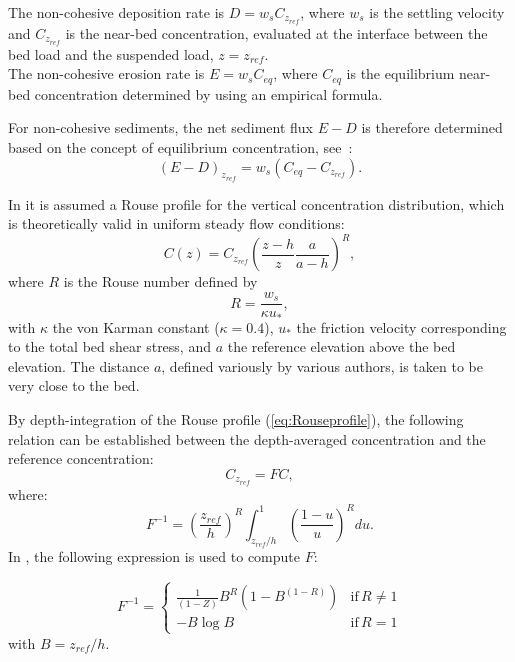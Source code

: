 The non-cohesive deposition rate is $D = w_s C_{z_{ref}}$, where $w_s$ is the settling velocity and $C_{z_{ref}}$ is the near-bed concentration, evaluated at the interface between the bed load
and the suspended load, $z=z_{ref}$.\\

The non-cohesive erosion rate is $E = w_s C_{eq}$, where $C_{eq}$ is the equilibrium near-bed concentration determined by using an empirical formula.

For non-cohesive sediments, the net sediment flux $E-D$ is therefore determined based on the concept of equilibrium concentration, see~\cite{CelikRodi}:
\begin{equation}\label{eq:CelikRodi}
\left(E-D \right)_{z_{ref}} = w_s \left(C_{eq} - C_{z_{ref}}\right).
\end{equation}

In \gaia{} it is assumed a Rouse profile for the vertical concentration distribution,
which is theoretically valid in uniform steady flow conditions:
\begin{equation}\label{eq:Rouseprofile}
C(z)=C_{z_{ref}}\left(\frac{z-h}{z}\frac{a}{a-h}\right)^R,
\end{equation}
where $R$ is the Rouse number defined by
\begin{equation}\label{eq:R}
R=\frac{w_s}{\kappa u_*},
\end{equation}
with $\kappa$ the von Karman constant ($\kappa = 0.4$), $u_*$ the
friction velocity corresponding to the total bed shear stress, and $a$ the reference elevation above the bed elevation. The distance $a$, defined variously by
various authors, is taken to be very close to the bed.

By depth-integration of the Rouse profile (\ref{eq:Rouseprofile}), the following relation
can be established between the depth-averaged concentration and the reference concentration:
\begin{equation*}
  C_{z_{ref}} = F C,
\end{equation*}
where:
\begin{equation}\label{eq:Rouseprofile}
F^{-1} = \left(\frac{z_{ref}}{h}\right)^R\int_{z_{ref}/h}^1\left(\frac{1-u}{u}\right)^R du.
\end{equation}
In \gaia{}, the following expression is used to compute $F$:

\begin{equation*}
F^{-1}=\left\{\begin{array}{ll}
\frac{1}{\left(1-Z\right)} B^R\left( 1-B^{(1-R)} \right) & \text{if}\,R \neq 1\\
-B \log B &  \text{if}\,R = 1
\end{array}
\right.
\end{equation*}
with $B = z_{ref}/h$.

